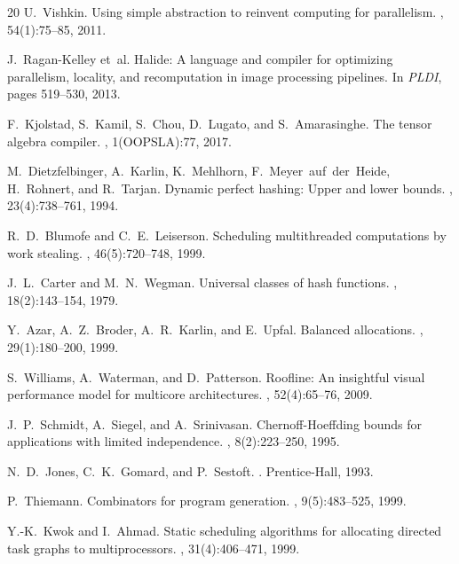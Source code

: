 \documentclass[11pt]{article}
\begin{document}
\begin{thebibliography}{20}
U.~Vishkin.
\newblock Using simple abstraction to reinvent computing for parallelism.
, 54(1):75--85, 2011.

J.~Ragan-Kelley et~al.
\newblock Halide: A language and compiler for optimizing parallelism,
  locality, and recomputation in image processing pipelines.
\newblock In {\em PLDI}, pages 519--530, 2013.

F.~Kjolstad, S.~Kamil, S.~Chou, D.~Lugato, and S.~Amarasinghe.
\newblock The tensor algebra compiler.
, 1(OOPSLA):77, 2017.

M.~Dietzfelbinger, A.~Karlin, K.~Mehlhorn, F.~Meyer~auf~der~Heide,
  H.~Rohnert, and R.~Tarjan.
\newblock Dynamic perfect hashing: Upper and lower bounds.
, 23(4):738--761, 1994.

R.~D.~Blumofe and C.~E.~Leiserson.
\newblock Scheduling multithreaded computations by work stealing.
, 46(5):720--748, 1999.

J.~L.~Carter and M.~N.~Wegman.
\newblock Universal classes of hash functions.
, 18(2):143--154, 1979.

Y.~Azar, A.~Z.~Broder, A.~R.~Karlin, and E.~Upfal.
\newblock Balanced allocations.
, 29(1):180--200, 1999.

S.~Williams, A.~Waterman, and D.~Patterson.
\newblock Roofline: An insightful visual performance model for multicore
  architectures.
, 52(4):65--76, 2009.

J.~P.~Schmidt, A.~Siegel, and A.~Srinivasan.
\newblock Chernoff-Hoeffding bounds for applications with limited independence.
, 8(2):223--250, 1995.

N.~D.~Jones, C.~K.~Gomard, and P.~Sestoft.
.
\newblock Prentice-Hall, 1993.

P.~Thiemann.
\newblock Combinators for program generation.
, 9(5):483--525, 1999.

Y.-K.~Kwok and I.~Ahmad.
\newblock Static scheduling algorithms for allocating directed task graphs to
  multiprocessors.
, 31(4):406--471, 1999.

\end{thebibliography}
\end{document}
